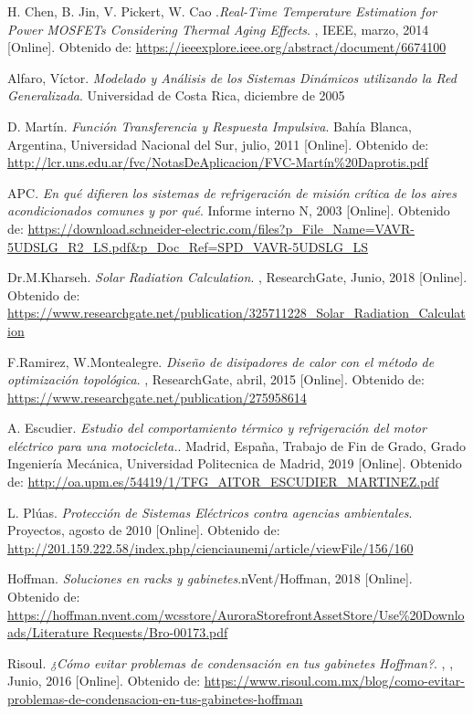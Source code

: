 \documentclass[notitlepage,oneside]{book}
\begin{document}
\begin{thebibliography}{99}
H. Chen, B. Jin, V. Pickert, W. Cao .\emph {Real-Time Temperature Estimation for Power MOSFETs Considering Thermal Aging Effects}. , IEEE, marzo, 2014 [Online]. Obtenido de: \url{https://ieeexplore.ieee.org/abstract/document/6674100}

Alfaro, Víctor. \emph {Modelado y Análisis de los Sistemas Dinámicos utilizando la Red Generalizada}. Universidad de Costa Rica, diciembre de 2005

D. Martín. \emph {Función Transferencia y Respuesta Impulsiva}. Bahía Blanca, Argentina, Universidad Nacional del Sur, julio, 2011 [Online]. Obtenido de: \url{http://lcr.uns.edu.ar/fvc/NotasDeAplicacion/FVC-Martín\%20Daprotis.pdf}

APC. \emph {En qué difieren los sistemas de refrigeración de misión crítica de los aires acondicionados comunes y por qué}. Informe interno N, 2003 [Online]. Obtenido de: \url{https://download.schneider-electric.com/files?p_File_Name=VAVR-5UDSLG_R2_LS.pdf&p_Doc_Ref=SPD_VAVR-5UDSLG_LS}

Dr.M.Kharseh. \emph {Solar Radiation Calculation}. , ResearchGate, Junio, 2018 [Online]. Obtenido de: \url{https://www.researchgate.net/publication/325711228_Solar_Radiation_Calculation}

F.Ramirez, W.Montealegre. \emph {Diseño de disipadores de calor con el método de optimización topológica}. , ResearchGate, abril, 2015 [Online]. Obtenido de: \url{https://www.researchgate.net/publication/275958614}

A. Escudier. \emph {Estudio del comportamiento térmico y refrigeración del motor eléctrico para una motocicleta.}. Madrid, España, Trabajo de Fin de Grado, Grado Ingeniería Mecánica, Universidad Politecnica de Madrid, 2019 [Online]. Obtenido de: \url{http://oa.upm.es/54419/1/TFG_AITOR_ESCUDIER_MARTINEZ.pdf}


L. Plúas. \emph {Protección de Sistemas Eléctricos contra agencias  ambientales}. Proyectos, agosto de 2010 [Online]. Obtenido de: \url{http://201.159.222.58/index.php/cienciaunemi/article/viewFile/156/160}

Hoffman. \emph {Soluciones en racks y gabinetes}.nVent/Hoffman, 2018 [Online]. Obtenido de: \url{https://hoffman.nvent.com/wcsstore/AuroraStorefrontAssetStore/Use\%20Downloads/Literature Requests/Bro-00173.pdf}

Risoul. \emph {¿Cómo evitar problemas de condensación en tus gabinetes Hoffman?}. , , Junio, 2016 [Online]. Obtenido de: \url{https://www.risoul.com.mx/blog/como-evitar-problemas-de-condensacion-en-tus-gabinetes-hoffman}


\end{thebibliography}
\end{document}
